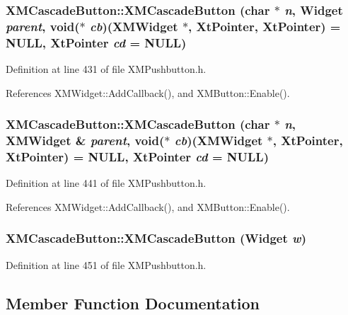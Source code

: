 \subsubsection{\setlength{\rightskip}{0pt plus 5cm}XMCascade\-Button::XMCascade\-Button (char $\ast$ {\em n}, Widget {\em parent}, void($\ast$ {\em cb})({\bf XMWidget} $\ast$, Xt\-Pointer, Xt\-Pointer) = NULL, Xt\-Pointer {\em cd} = NULL)\hspace{0.3cm}{\tt  [inline]}}\label{classXMCascadeButton_a2}




Definition at line 431 of file XMPushbutton.h.

References XMWidget::Add\-Callback(), and XMButton::Enable().
\subsubsection{\setlength{\rightskip}{0pt plus 5cm}XMCascade\-Button::XMCascade\-Button (char $\ast$ {\em n}, {\bf XMWidget} \& {\em parent}, void($\ast$ {\em cb})({\bf XMWidget} $\ast$, Xt\-Pointer, Xt\-Pointer) = NULL, Xt\-Pointer {\em cd} = NULL)\hspace{0.3cm}{\tt  [inline]}}\label{classXMCascadeButton_a3}




Definition at line 441 of file XMPushbutton.h.

References XMWidget::Add\-Callback(), and XMButton::Enable().
\subsubsection{\setlength{\rightskip}{0pt plus 5cm}XMCascade\-Button::XMCascade\-Button (Widget {\em w})\hspace{0.3cm}{\tt  [inline]}}\label{classXMCascadeButton_a4}




Definition at line 451 of file XMPushbutton.h.

\subsection{Member Function Documentation}
